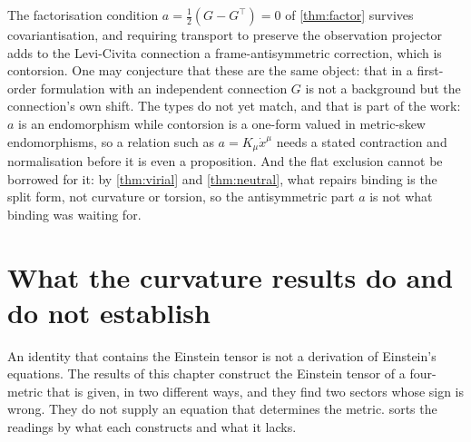 The factorisation condition $a=\tfrac12(G-G^{\!\top})=0$ of \cref{thm:factor} survives covariantisation, and requiring transport to preserve the observation projector
adds to the Levi-Civita connection a frame-antisymmetric correction, which is contorsion. One may conjecture that these are the same object: that in a first-order
formulation with an independent connection \cite{Peldan94} $G$ is not a background but the connection's own shift. The types do not yet match, and that is part of the
work: $a$ is an endomorphism while contorsion is a one-form valued in metric-skew endomorphisms, so a relation such as $a=K_\mu\dot x^\mu$ needs a stated contraction and
normalisation before it is even a proposition. And the flat exclusion cannot be borrowed for it: by \cref{thm:virial} and \cref{thm:neutral}, what repairs binding is
the split form, not curvature or torsion, so the antisymmetric part $a$ is not what binding was waiting for.

\section{What the curvature results do and do not establish}
\label{sec:gravlimits}

An identity that contains the Einstein tensor is not a derivation of Einstein's equations. The results of this chapter construct the
Einstein tensor of a four-metric that is given, in two different ways, and they find two sectors whose sign is wrong. They do not supply
an equation that determines the metric.  sorts the readings by what each constructs and what it lacks.

